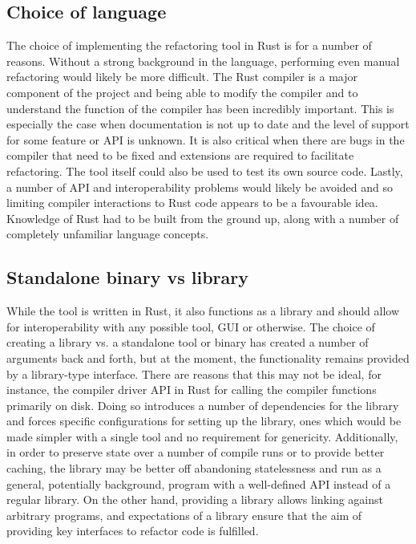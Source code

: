 \subsection{Choice of language}
The choice of implementing the refactoring tool in Rust is for a number of reasons. Without a strong background in the language, performing even manual refactoring would likely be more difficult. The Rust compiler is a major component of the project and being able to modify the compiler and to understand the function of the compiler has been incredibly important. This is especially the case when documentation is not up to date and the level of support for some feature or API is unknown. It is also critical when there are bugs in the compiler that need to be fixed and extensions are required to facilitate refactoring. The tool itself could also be used to test its own source code. Lastly, a number of API and interoperability problems would likely be avoided and so limiting compiler interactions to Rust code appears to be a favourable idea. Knowledge of Rust had to be built from the ground up, along with a number of completely unfamiliar language concepts.

\subsection{Standalone binary vs library}
While the tool is written in Rust, it also functions as a library and should allow for interoperability with any possible tool, GUI or otherwise. The choice of creating a library vs. a standalone tool or binary has created a number of arguments back and forth, but at the moment, the functionality remains provided by a library-type interface. There are reasons that this may not be ideal, for instance, the compiler driver API in Rust for calling the compiler functions primarily on disk. Doing so introduces a number of dependencies for the library and forces specific configurations for setting up the library, ones which would be made simpler with a single tool and no requirement for genericity. Additionally, in order to preserve state over a number of compile runs or to provide better caching, the library may be better off abandoning statelessness and run as a general, potentially background, program with a well-defined API instead of a regular library. On the other hand, providing a library allows linking against arbitrary programs, and expectations of a library ensure that the aim of providing key interfaces to refactor code is fulfilled.

